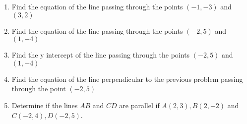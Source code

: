 \documentclass[11pt]{article}
\newenvironment{problem}[2][Problem]{\begin{trivlist}
\item[\hskip \labelsep {\bfseries #1}\hskip \labelsep {\bfseries #2.}]}{\end{trivlist}}
\newenvironment{sol}
    {\emph{Solution:}
    }
    {
    \qed
    }
\begin{document}
\begin{problem}{8}

  \begin{enumerate}[label=\roman*)]
  \item Find the equation of the line passing through the points $(-1,-3)$ and $(3,2)$
  \item Find the equation of the line passing through the points $(-2,5)$ and $(1,-4)$
  \item Find the y intercept of the line passing through the points $(-2,5)$ and $(1,-4)$
  \item Find the equation of the line perpendicular to the previous problem passing through the point $(-2,5)$
    \item Determine if the lines $AB$ and $CD$ are parallel if $A(2,3),B(2,-2)$ and $C(-2,4),D(-2,5)$.
  \end{enumerate}
  
\end{problem}





\end{document}
